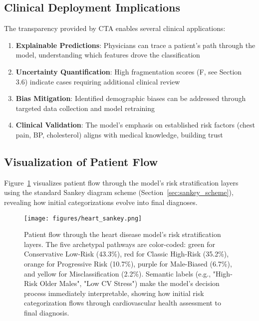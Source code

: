 \subsection{Clinical Deployment Implications}

The transparency provided by CTA enables several clinical applications:

\begin{enumerate}
    \item \textbf{Explainable Predictions}: Physicians can trace a patient's path through the model, understanding which features drove the classification
    \item \textbf{Uncertainty Quantification}: High fragmentation scores (F, see Section 3.6) indicate cases requiring additional clinical review
    \item \textbf{Bias Mitigation}: Identified demographic biases can be addressed through targeted data collection and model retraining
    \item \textbf{Clinical Validation}: The model's emphasis on established risk factors (chest pain, BP, cholesterol) aligns with medical knowledge, building trust
\end{enumerate}


\subsection{Visualization of Patient Flow}

Figure~\ref{fig:heart_sankey} visualizes patient flow through the model's risk stratification layers using the standard Sankey diagram scheme (Section~\ref{sec:sankey_scheme}), revealing how initial categorizations evolve into final diagnoses.

\begin{figure}[!htbp]
    \centering
    \texttt{[image: figures/heart\_sankey.png]}
    \caption{Patient flow through the heart disease model's risk stratification layers. The five archetypal pathways are color-coded: green for Conservative Low-Risk (43.3\%), red for Classic High-Risk (35.2\%), orange for Progressive Risk (10.7\%), purple for Male-Biased (6.7\%), and yellow for Misclassification (2.2\%). Semantic labels (e.g., "High-Risk Older Males", "Low CV Stress") make the model's decision process immediately interpretable, showing how initial risk categorization flows through cardiovascular health assessment to final diagnosis.}
    \label{fig:heart_sankey}
\end{figure}


